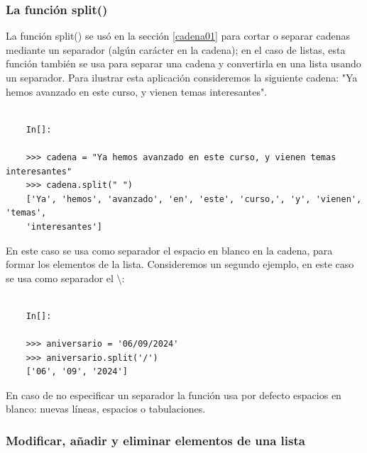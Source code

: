 \subsubsection{La función split()}   



La función  {\ttfamily split()} se usó en la sección \ref{cadena01} para  cortar o  separar cadenas mediante un separador (algún carácter en la cadena); en el caso de listas, esta función también se usa para separar una cadena y convertirla en una  lista usando un separador. Para ilustrar esta aplicación consideremos la siguiente cadena: {\ttfamily "{}Ya hemos avanzado en este curso, y vienen temas interesantes{}"{}}.

\begin{lstlisting}
	
	In[]:
	
	>>> cadena = "Ya hemos avanzado en este curso, y vienen temas interesantes"
	>>> cadena.split(" ")
	['Ya', 'hemos', 'avanzado', 'en', 'este', 'curso,', 'y', 'vienen', 'temas', 
	'interesantes']
\end{lstlisting} En este caso se usa como separador el espacio en blanco en la cadena, para formar los elementos de la lista. Consideremos un segundo ejemplo, en este caso se usa como separador el {\ttfamily\textbackslash}:

\begin{lstlisting}
	
	In[]:
	
	>>> aniversario = '06/09/2024'
	>>> aniversario.split('/')
	['06', '09', '2024']
\end{lstlisting}


En caso de  no especificar un separador la función usa por defecto espacios en blanco: nuevas líneas, espacios o tabulaciones.










\subsubsection{Modificar, añadir y eliminar elementos de una lista}   %

